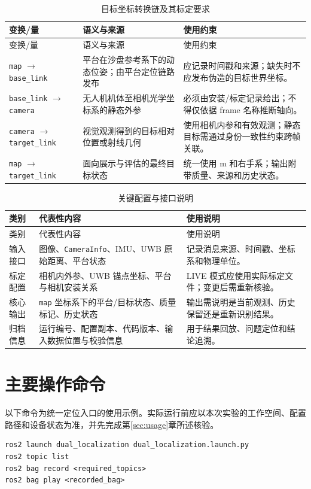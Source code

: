 \documentclass[UTF8,a4paper,12pt]{ctexart}
\begin{document}
\begin{longtable}{p{3.7cm}p{3.3cm}p{4.8cm}}
\caption{目标坐标转换链及其标定要求}\label{tab:coordinate-chain}\\
\toprule
变换/量 & 语义与来源 & 使用约束 \\
\midrule
\endfirsthead
\toprule
变换/量 & 语义与来源 & 使用约束 \\
\midrule
\endhead
\texttt{map} $\rightarrow$ \texttt{base\_link} & 平台在沙盘参考系下的动态位姿；由平台定位链路发布 & 应记录时间戳和来源；缺失时不应发布伪造的目标世界坐标。\\
\texttt{base\_link} $\rightarrow$ \texttt{camera} & 无人机机体至相机光学坐标系的静态外参 & 必须由安装/标定记录给出；不得仅依据 frame 名称推断轴向。\\
\texttt{camera} $\rightarrow$ \texttt{target\_link} & 视觉观测得到的目标相对位置或射线几何 & 使用相机内参和有效观测；静态目标需通过身份一致性约束跨帧关联。\\
\texttt{map} $\rightarrow$ \texttt{target\_link} & 面向展示与评估的最终目标状态 & 统一使用 m 和右手系；输出附带质量、来源和历史状态。\\
\bottomrule
\end{longtable}

\begin{longtable}{p{3.0cm}p{3.6cm}p{5.2cm}}
\caption{关键配置与接口说明}\label{tab:appendix-interface}\\
\toprule
类别 & 代表性内容 & 使用说明 \\
\midrule
\endfirsthead
\toprule
类别 & 代表性内容 & 使用说明 \\
\midrule
\endhead
输入接口 & 图像、\texttt{CameraInfo}、IMU、UWB 原始距离、平台状态 & 记录消息来源、时间戳、坐标系和物理单位。\\
标定配置 & 相机内外参、UWB 锚点坐标、平台与相机安装关系 & LIVE 模式应使用实际标定文件；变更后需重新核验。\\
核心输出 & \texttt{map} 坐标系下的平台/目标状态、质量标记、历史状态 & 输出需说明是当前观测、历史保留还是重新识别结果。\\
归档信息 & 运行编号、配置副本、代码版本、输入数据位置与校验信息 & 用于结果回放、问题定位和结论追溯。\\
\bottomrule
\end{longtable}

\section{主要操作命令}
以下命令为统一定位入口的使用示例。实际运行前应以本次实验的工作空间、配置路径和设备状态为准，并先完成第\ref{sec:usage}章所述核验。
\begin{verbatim}
ros2 launch dual_localization dual_localization.launch.py
ros2 topic list
ros2 bag record <required_topics>
ros2 bag play <recorded_bag>
\end{verbatim}
\end{document}
